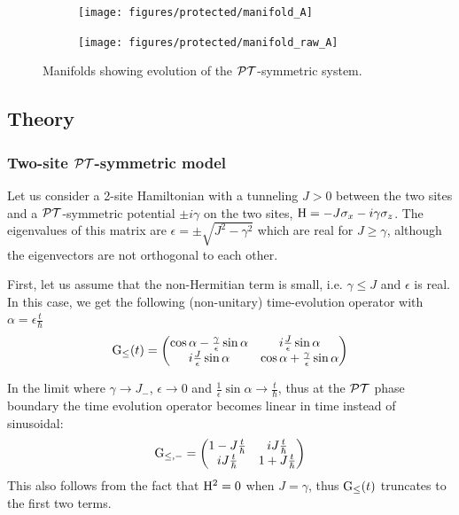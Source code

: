 \begin{figure}[t]
  \centering
  \begin{subfigure}{0.49\textwidth}
    \texttt{[image: figures/protected/manifold\_A]}
    \caption{}
  \end{subfigure}
  \begin{subfigure}{0.49\textwidth}
    \texttt{[image: figures/protected/manifold\_raw\_A]}
    \caption{}
  \end{subfigure}
  \caption[Manifolds showing evolution of the $\pt$-symmetric system]
  {Manifolds showing evolution of the \(\pt\)-symmetric system.}
  \label{fig:manifold}
\end{figure}

\subsection{Theory}
\subsubsection{Two-site \(\pt\)-symmetric model}
Let us consider a 2-site Hamiltonian with a tunneling \(J > 0\) between the two
sites and a \(\pt\)-symmetric potential \(\pm i \gamma\) on the two sites, \(
\mathrm{H} = -J \sigma_x -i \gamma \sigma_z\). The eigenvalues of this matrix are
\( \epsilon = \pm \sqrt{J^{2} - \gamma^{2}} \) which are real for \( J \geq
\gamma \), although the eigenvectors are not orthogonal to each other.

First, let us assume that the non-Hermitian term is small, i.e. \( \gamma \leq
J \) and \( \epsilon \) is real. In this case, we get the following
(non-unitary) time-evolution operator with \( \alpha = \epsilon \frac{t}{\hbar}
\)
\begin{equation}
  \mathrm{G}_{\leq} \!\left(t\right) = \begin{pmatrix}
    \cos \alpha - \frac{\gamma}{\epsilon} \sin \alpha &
    i \frac{J}{\epsilon} \sin \alpha \\
    i \frac{J}{\epsilon} \sin \alpha &
    \cos \alpha + \frac{\gamma}{\epsilon} \sin \alpha
  \end{pmatrix}
\end{equation}

In the limit where \( \gamma \rightarrow J_{-} \), \( \epsilon \rightarrow 0 \)
and \( \frac{1}{\epsilon} \sin \alpha \rightarrow \frac{t}{\hbar} \), thus at
the \(\pt\) phase boundary the time evolution operator becomes linear in time
instead of sinusoidal:
\begin{equation}
  \mathrm{G}_{\leq,-} = \begin{pmatrix}
    1-J\frac{t}{\hbar} & i J\frac{t}{\hbar} \\
    i J\frac{t}{\hbar} & 1+J\frac{t}{\hbar}
  \end{pmatrix}
\end{equation}
This also follows from the fact that \( \mathrm{H}^{2} = 0\) when \(J = \gamma\),
thus \( \mathrm{G}_{\leq} \!\left(t\right) \) truncates to the first two terms.

